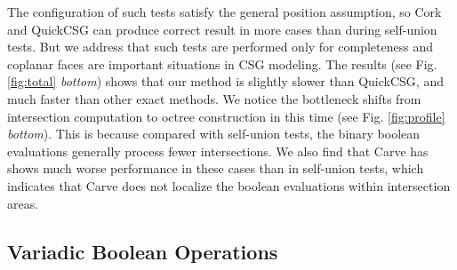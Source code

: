 The configuration of such tests satisfy the general position assumption, so Cork and QuickCSG can produce correct result in more cases than during self-union tests. But we address that such tests are performed only for completeness and coplanar faces are important situations in CSG modeling. The results (see Fig. \ref{fig:total} \emph{bottom}) shows that our method is slightly slower than QuickCSG, and much faster than other exact methods. We notice the bottleneck shifts from intersection computation to octree construction in this time (see Fig. \ref{fig:profile} \emph{bottom}). This is because compared with self-union tests, the binary boolean evaluations generally process fewer intersections. We also find that Carve has shows much worse performance in these cases than in self-union tests, which indicates that Carve does not localize the boolean evaluations within intersection areas.

\subsection{Variadic Boolean Operations}


